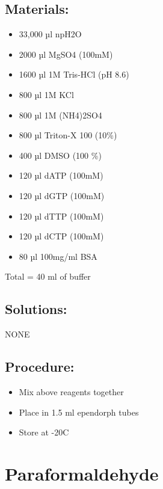 \documentclass[
  letterpaper,
  DIV=11,
  numbers=noendperiod]{scrreprt}
\providecommand{\tightlist}{%
  \setlength{\itemsep}{0pt}\setlength{\parskip}{0pt}}\usepackage{longtable,booktabs,array}
\begin{document}
\hypertarget{materials-13}{%
\section{Materials:}\label{materials-13}}

\begin{itemize}
\tightlist
\item
  33,000 µl npH2O
\item
  2000 µl MgSO4 (100mM)
\item
  1600 µl 1M Tris-HCl (pH 8.6)
\item
  800 µl 1M KCl
\item
  800 µl 1M (NH4)2SO4
\item
  800 µl Triton-X 100 (10\%)
\item
  400 µl DMSO (100 \%)
\item
  120 µl dATP (100mM)
\item
  120 µl dGTP (100mM)
\item
  120 µl dTTP (100mM)
\item
  120 µl dCTP (100mM)
\item
  80 µl 100mg/ml BSA
\end{itemize}

Total = 40 ml of buffer

\hypertarget{solutions-13}{%
\section{Solutions:}\label{solutions-13}}

NONE

\hypertarget{procedure-13}{%
\section{Procedure:}\label{procedure-13}}

\begin{itemize}
\tightlist
\item
  Mix above reagents together
\item
  Place in 1.5 ml ependorph tubes
\item
  Store at -20C
\end{itemize}

\hypertarget{sec-molecular-paraformaldehyde}{%
\chapter{Paraformaldehyde}\label{sec-molecular-paraformaldehyde}}
\end{document}

